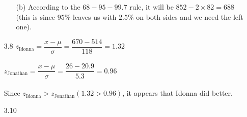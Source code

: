 \documentclass[11pt, a4paper]{article}
\begin{document}
\begin{itemize}
\begin{itemize}
\item[]

\item[(b)]
According to the $68 - 95 - 99.7$ rule, it will be
$852 - 2 \times 82 = 688$ (this is since $95\%$ leaves
us with $2.5\%$ on both sides and we need the left one).
\end{itemize}

\item[]
\item[]

\item[3.8]
$z_{\text{Idonna}} = \dfrac{x - \mu}{\sigma} = \dfrac{670 - 514}{118} = 1.32$\\\\
$z_{\text{Jonathan}} = \dfrac{x - \mu}{\sigma} = \dfrac{26 - 20.9}{5.3} = 0.96$\\\\
Since $z_{\text{Idonna}} > z_{\text{Jonathan}} (1.32 > 0.96)$, it appears that Idonna did better.

\newpage

\item[3.10]


\end{itemize}
\end{document}

